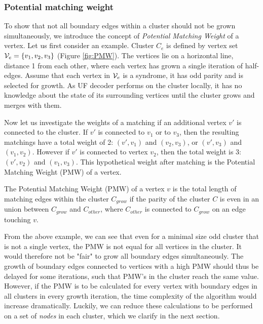 \subsubsection{Potential matching weight}\label{sec:PMW}

To show that not all boundary edges within a cluster should not be grown simultaneously, we introduce the concept of \emph{Potential Matching Weight} of a vertex. Let us first consider an example. Cluster $C_e$ is defined by vertex set $\mathcal{V}_e = \{v_1, v_2, v_3\}$ (Figure \ref{fig:PMW}). The vertices lie on a horizontal line, distance 1 from each other, where each vertex has grown a single iteration of half-edges. Assume that each vertex in $\mathcal{V}_e$ is a syndrome, it has odd parity and is selected for growth. As UF decoder performs on the cluster locally, it has no knowledge about the state of its surrounding vertices until the cluster grows and merges with them. 

Now let us investigate the weights of a matching if an additional vertex $v'$ is connected to the cluster.
If $v'$ is connected to $v_1$ or to $v_3$, then the resulting matchings have a total weight of 2: $(v',v_1)$ and $(v_2,v_3)$, or $(v',v_3)$ and $(v_1,v_2)$. However if $v'$ is connected to vertex $v_2$, then the total weight is 3: $(v', v_2)$ and $(v_1, v_3)$. This hypothetical weight after matching is the Potential Matching Weight (PMW) of a vertex.

\begin{lemma}
  The Potential Matching Weight (PMW) of a vertex $v$ is the total length of matching edges within the cluster $C_{grow}$ if the parity of the cluster $C$ is even in an union between $C_{grow}$ and $C_{other}$, where $C_{other}$ is connected to $C_{grow}$ on an edge touching $v$.
\end{lemma}

From the above example, we can see that even for a minimal size odd cluster that is not a single vertex, the PMW is not equal for all vertices in the cluster. It would therefore not be "fair" to grow all boundary edges simultaneously. The growth of boundary edges connected to vertices with a high PMW should thus be delayed for some iterations, such that PMW's in the cluster reach the same value. However, if the PMW is to be calculated for every vertex with boundary edges in all clusters in every growth iteration, the time complexity of the algorithm would increase dramatically. Luckily, we can reduce these calculations to be performed on a set of \emph{nodes} in each cluster, which we clarify in the next section.


